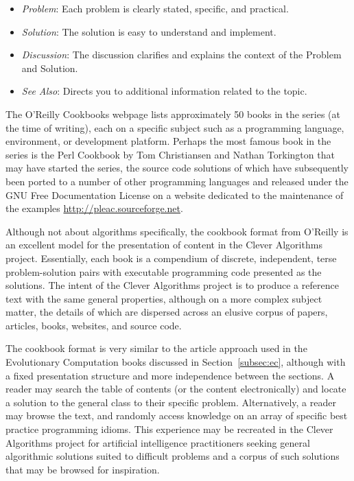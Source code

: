 \documentclass[a4paper, 11pt]{article}
\begin{document}
\begin{itemize}
	\item \emph{Problem}: Each problem is clearly stated, specific, and practical.
	\item \emph{Solution}: The solution is easy to understand and implement.
	\item \emph{Discussion}: The discussion clarifies and explains the context of the Problem and Solution.
	\item \emph{See Also}: Directs you to additional information related to the topic.
\end{itemize}

The O'Reilly Cookbooks webpage lists approximately 50 books in the series (at the time of writing), each on a specific subject such as a programming language, environment, or development platform. Perhaps the most famous book in the series is the Perl Cookbook by Tom Christiansen and Nathan Torkington \cite{Christiansen2003} that may have started the series, the source code solutions of which have subsequently been ported to a number of other programming languages and released under the GNU Free Documentation License on a website dedicated to the maintenance of the examples \url{http://pleac.sourceforge.net}.

Although not about algorithms specifically, the cookbook format from O'Reilly is an excellent model for the presentation of content in the Clever Algorithms project. Essentially, each book is a compendium of discrete, independent, terse problem-solution pairs with executable programming code presented as the solutions.
The intent of the Clever Algorithms project is to produce a reference text with the same general properties, although on a more complex subject matter, the details of which are dispersed across an elusive corpus of papers, articles, books, websites, and source code.

The cookbook format is very similar to the article approach used in the Evolutionary Computation books discussed in Section~\ref{subsec:ec}, although with a fixed presentation structure and more independence between the sections. A reader may search the table of contents (or the content electronically) and locate a solution to the general class to their specific problem. Alternatively, a reader may browse the text, and randomly access knowledge on an array of specific best practice programming idioms.
This experience may be recreated in the Clever Algorithms project for artificial intelligence practitioners seeking general algorithmic solutions suited to difficult problems and a corpus of such solutions that may be browsed for inspiration.
\end{document}

